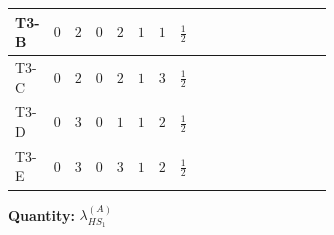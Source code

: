 \documentclass[8pt]{article}
\begin{document}
\begin{landscape}
\begin{longtable}{@{}llcccccc >{\raggedright\arraybackslash}p{0.21\linewidth} >{\raggedright\arraybackslash}p{0.21\linewidth} >{\raggedright\arraybackslash}p{0.21\linewidth}@{}}
T3-B & $0$ & $2$ & $0$ & $2$ & $1$ & $1$ & $\frac{1}{2}$ & \scriptsize\adjustbox{max width=\linewidth}{$\begin{gathered} +2 {\lambda_1} {\lambda_{HS_1}^{(A)}}\end{gathered}$} & \scriptsize\adjustbox{max width=\linewidth}{$\begin{gathered} +8 {\lambda_{HS_1}^{(1)}} {\lambda_{HS_1}^{(A)}}\end{gathered}$} & \scriptsize\adjustbox{max width=\linewidth}{$\begin{gathered} +2 {\lambda_{HS_1}^{(A)}} {\lambda_{S_1}^{(1)}}\end{gathered}$} \\
\midrule
T3-C & $0$ & $2$ & $0$ & $2$ & $1$ & $3$ & $\frac{1}{2}$ & \scriptsize\adjustbox{max width=\linewidth}{$\begin{gathered} +2 {\lambda_1} {\lambda_{HS_1}^{(A)}}\end{gathered}$} & \scriptsize\adjustbox{max width=\linewidth}{$\begin{gathered} +8 {\lambda_{HS_1}^{(1)}} {\lambda_{HS_1}^{(A)}}\end{gathered}$} & \scriptsize\adjustbox{max width=\linewidth}{$\begin{gathered} +2 {\lambda_{HS_1}^{(A)}} {\lambda_{S_1}^{(1)}}\end{gathered}$} \\
\midrule
T3-D & $0$ & $3$ & $0$ & $1$ & $1$ & $2$ & $\frac{1}{2}$ & \scriptsize\adjustbox{max width=\linewidth}{$\begin{gathered} +2 {\lambda_1} {\lambda_{HS_1}^{(A)}}\end{gathered}$} & \scriptsize\adjustbox{max width=\linewidth}{$\begin{gathered} +8 {\lambda_{HS_1}^{(1)}} {\lambda_{HS_1}^{(A)}}\end{gathered}$} & \scriptsize\adjustbox{max width=\linewidth}{$\begin{gathered} +2 {\lambda_{HS_1}^{(A)}} {\lambda_{S_1}^{(1)}}\end{gathered}$} \\
\midrule
T3-E & $0$ & $3$ & $0$ & $3$ & $1$ & $2$ & $\frac{1}{2}$ & \scriptsize\adjustbox{max width=\linewidth}{$\begin{gathered} +2 {\lambda_1} {\lambda_{HS_1}^{(A)}}\end{gathered}$} & \scriptsize\adjustbox{max width=\linewidth}{$\begin{gathered} +8 {\lambda_{HS_1}^{(1)}} {\lambda_{HS_1}^{(A)}}\end{gathered}$} & \scriptsize\adjustbox{max width=\linewidth}{$\begin{gathered} +2 {\lambda_{HS_1}^{(A)}} {\lambda_{S_1}^{(1)}}\end{gathered}$} \\
\midrule
\bottomrule
\end{longtable}
\clearpage
\noindent\textbf{Quantity: }$\lambda_{HS_1}^{(A)}$\par\smallskip

\end{landscape}
\end{document}
